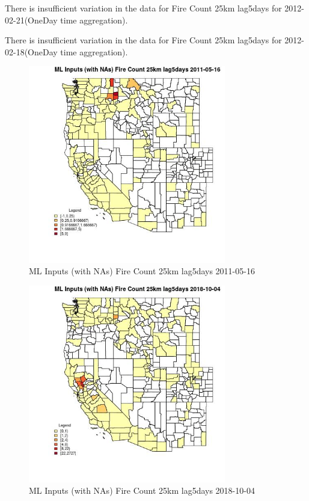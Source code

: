 There is insufficient variation in the data for Fire Count 25km lag5days for 2012-02-21(OneDay time aggregation). 
 

There is insufficient variation in the data for Fire Count 25km lag5days for 2012-02-18(OneDay time aggregation). 
 

\begin{figure} 
\centering  
\includegraphics[width=0.77\textwidth]{Code_Outputs/Report_ML_input_PM25_Step4_part_f_de_duplicated_aveswNAs_CountyFire_Count_25km_lag5daysMean2011-05-16.jpg} 
\caption{\label{fig:Report_ML_input_PM25_Step4_part_f_de_duplicated_aveswNAsCountyFire_Count_25km_lag5daysMean2011-05-16}ML Inputs (with NAs) Fire Count 25km lag5days 2011-05-16} 
\end{figure} 
 

\begin{figure} 
\centering  
\includegraphics[width=0.77\textwidth]{Code_Outputs/Report_ML_input_PM25_Step4_part_f_de_duplicated_aveswNAs_CountyFire_Count_25km_lag5daysMean2018-10-04.jpg} 
\caption{\label{fig:Report_ML_input_PM25_Step4_part_f_de_duplicated_aveswNAsCountyFire_Count_25km_lag5daysMean2018-10-04}ML Inputs (with NAs) Fire Count 25km lag5days 2018-10-04} 
\end{figure} 
 

